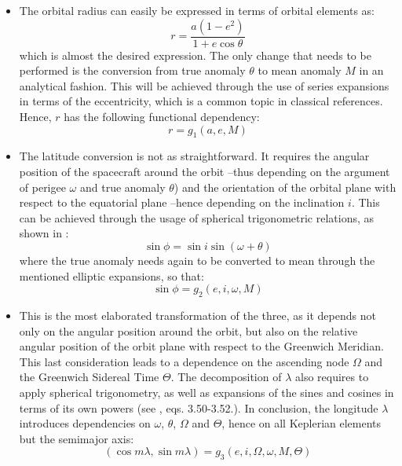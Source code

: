 	\begin{itemize}
	\item[\GMVred{I.} ]  The orbital radius can easily be expressed in terms of orbital elements as:
	\[
	r = \dfrac{a (1 - e^2) }{1 + e \cos \theta}
	\]
	\noindent which is almost the desired expression. The only change that needs to be performed is the conversion from true anomaly $\theta$ to mean anomaly $M$ in an analytical fashion. This will be achieved through the use of series expansions in terms of the eccentricity, which is a common topic in classical references. Hence, $r$ has the following functional dependency:
	\begin{equation}
	r = g_1(a, e, M)
	\end{equation}
	\item[\GMVred{II.} ]  The latitude conversion is not as straightforward. It requires the angular position of the spacecraft around the orbit --thus depending on the argument of perigee $\omega$ and true anomaly $\theta$) and the orientation of the orbital plane with respect to the equatorial plane --hence depending on the inclination $i$. This can be achieved through the usage of spherical trigonometric relations, as shown in \cite[see][p. 32, eq. 3.56]{Kaula}:
	\[
	\sin \phi = \sin i \sin(\omega + \theta) 
	\]
	\noindent where the true anomaly needs again to be converted to mean through the mentioned elliptic expansions, so that:
	\begin{equation}
	\sin\phi = g_2(e, i, \omega, M)
	\end{equation}
	\item[\GMVred{III.} ]  This is the most elaborated transformation of the three, as it depends not only on the angular position around the orbit, but also on the relative angular position of the orbit plane with respect to the Greenwich Meridian. This last consideration leads to a dependence on the ascending node $\Omega$ and the Greenwich Sidereal Time $\Theta$. The decomposition of $\lambda$ also requires to apply spherical trigonometry, as well as expansions of the sines and cosines in terms of its own powers (see \cite{Kaula}, eqs. 3.50-3.52.). In conclusion, the longitude $\lambda$ introduces dependencies on $\omega$, $\theta$, $\Omega$ and $\Theta$, hence on all Keplerian elements but the semimajor axis:
	\begin{equation}
	(\cos m\lambda, \sin m\lambda) = g_3(e, i, \Omega, \omega, M, \Theta)
	\end{equation}
	\end{itemize}
